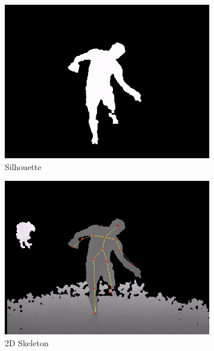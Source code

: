 \begin{figure}
\begin{subfigure}{.32\linewidth}
        \includegraphics[width=\linewidth]{Pics/04_Data/frame53_mask.jpg}
        \caption{Silhouette}
    \end{subfigure}
    \begin{subfigure}{.32\linewidth}
        \includegraphics[width=\linewidth]{Pics/04_Data/frame53_skelet2D.jpg}
        \caption{2D Skeleton}
    \end{subfigure}
    \begin{subfigure}{.32\linewidth}

\end{subfigure}
\end{figure}
